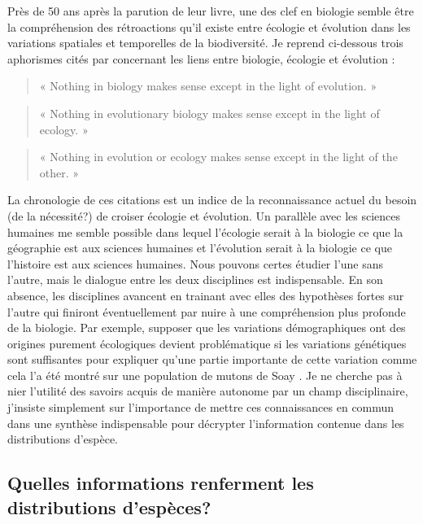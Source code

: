 Près de 50 ans après la parution de leur livre, une des clef en biologie
semble être la compréhension des rétroactions qu'il existe entre
écologie et évolution dans les variations spatiales et temporelles de la
biodiversité. Je reprend ci-dessous trois aphorismes cités par
\citet{Schoener2011a} concernant les liens entre biologie, écologie et
évolution :

\begin{quote}
« Nothing in biology makes sense except in the light of evolution. »
\citep{Dobzhansky1973}
\end{quote}

\begin{quote}
« Nothing in evolutionary biology makes sense except in the light of
ecology. » \citep{grant2008}
\end{quote}

\begin{quote}
« Nothing in evolution or ecology makes sense except in the light of the
other. » \citep{Pelletier2009a}
\end{quote}

La chronologie de ces citations est un indice de la reconnaissance
actuel du besoin (de la nécessité?) de croiser écologie et évolution. Un
parallèle avec les sciences humaines me semble possible dans lequel
l'écologie serait à la biologie ce que la géographie est aux sciences
humaines et l'évolution serait à la biologie ce que l'histoire est aux
sciences humaines. Nous pouvons certes étudier l'une sans l'autre, mais
le dialogue entre les deux disciplines est indispensable. En son
absence, les disciplines avancent en trainant avec elles des hypothèses
fortes sur l'autre qui finiront éventuellement par nuire à une
compréhension plus profonde de la biologie. Par exemple, supposer que
les variations démographiques ont des origines purement écologiques
devient problématique si les variations génétiques sont suffisantes pour
expliquer qu'une partie importante de cette variation comme cela l'a été
montré sur une population de mutons de Soay \citep{Pelletier2007}. Je ne
cherche pas à nier l'utilité des savoirs acquis de manière autonome par
un champ disciplinaire, j'insiste simplement sur l'importance de mettre
ces connaissances en commun dans une synthèse indispensable pour
décrypter l'information contenue dans les distributions d'espèce.

\subsection*{Quelles informations renferment les distributions
d'espèces?}\label{quelles-informations-renferment-les-distributions-despuxe8ces}

